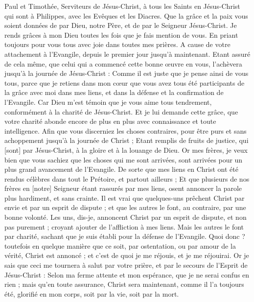 \BFont
\begin{multicols}{2}
\VerseOne{}Paul et Timothée, Serviteurs de Jésus-Christ, à tous les Saints en Jésus-Christ qui sont à Philippes, avec les Evêques et les Diacres.
Que la grâce et la paix vous soient données de par Dieu, notre Père, et de par le Seigneur Jésus-Christ.
Je rends grâces à mon Dieu toutes les fois que je fais mention de vous.
En priant toujours pour vous tous avec joie dans toutes mes prières.
A cause de votre attachement à l'Evangile, depuis le premier jour jusqu'à maintenant.
Etant assuré de cela même, que celui qui a commencé cette bonne œuvre en vous, l'achèvera jusqu'à la journée de Jésus-Christ :
Comme il est juste que je pense ainsi de vous tous, parce que je retiens dans mon cœur que vous avez tous été participants de la grâce avec moi dans mes liens, et dans la défense et la confirmation de l'Evangile.
Car Dieu m'est témoin que je vous aime tous tendrement, conformément à la charité de Jésus-Christ.
Et je lui demande cette grâce, que votre charité abonde encore de plus en plus avec connaissance et toute intelligence.
Afin que vous discerniez les choses contraires, pour être purs et sans achoppement jusqu'à la journée de Christ ;
Etant remplis de fruits de justice, qui [sont] par Jésus-Christ, à la gloire et à la louange de Dieu.
Or mes frères, je veux bien que vous sachiez que les choses qui me sont arrivées, sont arrivées pour un plus grand avancement de l'Evangile.
De sorte que mes liens en Christ ont été rendus célèbres dans tout le Prétoire, et partout ailleurs ;
Et que plusieurs de nos frères en [notre] Seigneur étant rassurés par mes liens, osent annoncer la parole plus hardiment, et sans crainte.
Il est vrai que quelques-uns prêchent Christ par envie et par un esprit de dispute ; et que les autres le font, au contraire, par une bonne volonté.
Les uns, dis-je, annoncent Christ par un esprit de dispute, et non pas purement ; croyant ajouter de l'affliction à mes liens.
Mais les autres le font par charité, sachant que je suis établi pour la défense de l'Evangile.
Quoi donc ? toutefois en quelque manière que ce soit, par ostentation, ou par amour de la vérité, Christ est annoncé ; et c'est de quoi je me réjouis, et je me réjouirai.
Or je sais que ceci me tournera à salut par votre prière, et par le secours de l'Esprit de Jésus-Christ :
Selon ma ferme attente et mon espérance, que je ne serai confus en rien ; mais qu'en toute assurance, Christ sera maintenant, comme il l'a toujours été, glorifié en mon corps, soit par la vie, soit par la mort.

\end{multicols}
